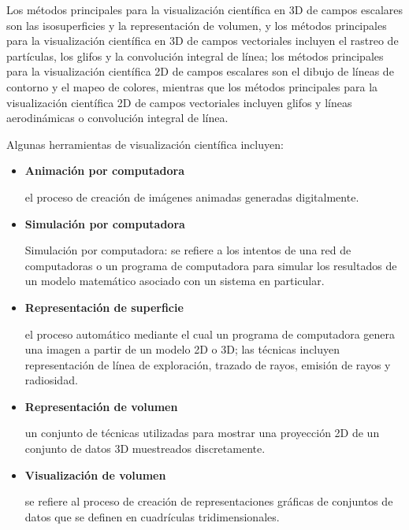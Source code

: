         Los métodos principales para la visualización científica en 3D de campos escalares son las isosuperficies y la representación de volumen, y los métodos principales para la visualización científica en 3D de campos vectoriales incluyen el rastreo de partículas, los glifos y la convolución integral de línea; los métodos principales para la visualización científica 2D de campos escalares son el dibujo de líneas de contorno y el mapeo de colores, mientras que los métodos principales para la visualización científica 2D de campos vectoriales incluyen glifos y líneas aerodinámicas o convolución integral de línea.
        
        Algunas herramientas de visualización científica incluyen:

        \begin{itemize}

            \item \textbf{Animación por computadora} 

            el proceso de creación de imágenes animadas generadas digitalmente. \hfill 

            \item \textbf{Simulación por computadora} 

            Simulación por computadora: se refiere a los intentos de una red de computadoras o un programa de computadora para simular los resultados de un modelo matemático asociado con un sistema en particular. \hfill 

            \item \textbf{Representación de superficie} 

            el proceso automático mediante el cual un programa de computadora genera una imagen a partir de un modelo 2D o 3D; las técnicas incluyen representación de línea de exploración, trazado de rayos, emisión de rayos y radiosidad. \hfill 

            \item \textbf{Representación de volumen} 

            un conjunto de técnicas utilizadas para mostrar una proyección 2D de un conjunto de datos 3D muestreados discretamente. \hfill 

            \item \textbf{Visualización de volumen} 

            se refiere al proceso de creación de representaciones gráficas de conjuntos de datos que se definen en cuadrículas tridimensionales. \hfill 

        \end{itemize}






